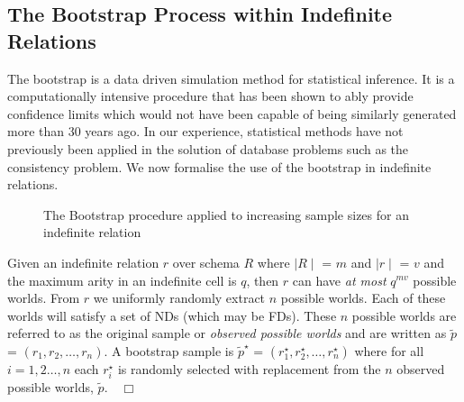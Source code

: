 \subsection{The Bootstrap Process within Indefinite Relations}\label{subsec:boot_proc}

The bootstrap is a data driven simulation method for
statistical inference. It is a computationally intensive procedure
that has been shown to ably provide confidence limits which would not have
been capable of being similarly generated more than 30 years ago.
In our experience, statistical methods have not previously been 
applied in the solution of database problems such as the consistency problem.
We now formalise the use of the bootstrap in indefinite relations.
\medskip

\begin{figure}[ht]
\centerline{}
\caption{\label{fig:inc_boot} The Bootstrap procedure applied to
increasing sample sizes for an indefinite relation}
\end{figure}
\begin{definition}
\begin{rm}
Given an indefinite relation $r$ over schema $R$ where $\mid R \mid$ =
$m$ and $\mid r \mid$ = $v$ and the maximum arity in an
indefinite cell is $q$, then $r$ can have {\em at most} $q^{mv}$ possible
worlds.  From $r$ we uniformly randomly extract $n$ possible worlds.
Each of these worlds will satisfy a set of NDs (which may be FDs). These $n$ possible
worlds are referred to as the original sample or {\em observed possible 
worlds }
and are written as {\bf $\tilde{p}$} = $(r_1, r_2, \ldots, r_n)$. A
bootstrap sample is {\bf $\tilde{p}^\star$} = $(r_1^\star, r_2^\star, \ldots, r_n^\star )$ where for all $i = 1,2 \ldots, n$ each $r_i^\star$ is randomly
selected with replacement from the $n$ observed possible worlds,
{\bf $\tilde{p}$}.$\quad\Box$
\end{rm}
\end{definition}

